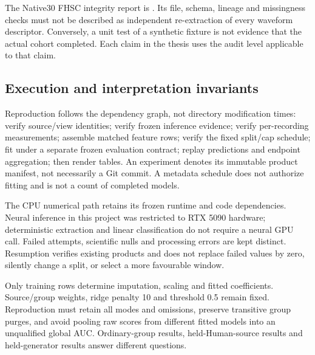 The Native30 FHSC integrity report is
.
Its file, schema, lineage and missingness checks must not be described as
independent re-extraction of every waveform descriptor. Conversely, a unit
test of a synthetic fixture is not evidence that the actual cohort completed.
Each claim in the thesis uses the audit level applicable to that claim.

\subsection{Execution and interpretation invariants}
Reproduction follows the dependency graph, not directory modification times:
verify source/view identities; verify frozen inference evidence; verify
per-recording measurements; assemble matched feature rows; verify the
fixed split/cap schedule; fit under a separate frozen evaluation contract;
replay predictions and endpoint aggregation; then render tables. An
experiment  denotes its immutable product manifest,
not necessarily a Git commit. A metadata schedule does not authorize fitting
and is not a count of completed models.

The CPU numerical path retains its frozen runtime and code dependencies.
Neural inference in this project was restricted to RTX 5090 hardware;
deterministic extraction and linear classification do not require a neural
GPU call. Failed attempts, scientific nulls and processing errors are kept
distinct. Resumption verifies existing products and does not replace failed
values by zero, silently change a split, or select a more favourable window.

Only training rows determine imputation, scaling and fitted coefficients.
Source/group weights, ridge penalty 10 and threshold 0.5 remain fixed.
Reproduction must retain all modes and omissions, preserve transitive group
purges, and avoid pooling raw scores from different fitted models into an
unqualified global AUC. Ordinary-group results, held-Human-source results
and held-generator results answer different questions.

